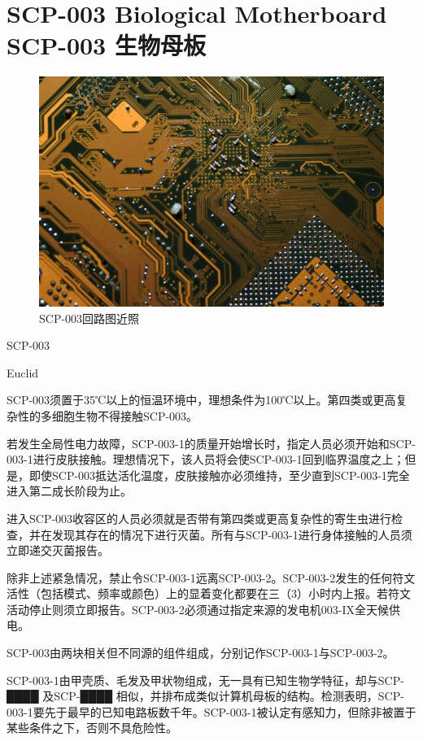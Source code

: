 \chapter[SCP-003 生物母板]{
	SCP-003 Biological Motherboard\\
	SCP-003 生物母板
}

\label{chap:SCP-003}

\begin{figure}[H]
	\centering
	\includegraphics[width=0.5\linewidth]{images/SCP.003.jpg}
	\caption*{SCP-003回路图近照}
\end{figure}

SCP-003

Euclid


SCP-003须置于35℃以上的恒温环境中，理想条件为100℃以上。第四类或更高复杂性的多细胞生物不得接触SCP-003。

若发生全局性电力故障，SCP-003-1的质量开始增长时，指定人员必须开始和SCP-003-1进行皮肤接触。理想情况下，该人员将会使SCP-003-1回到临界温度之上；但是，即使SCP-003抵达活化温度，皮肤接触亦必须维持，至少直到SCP-003-1完全进入第二成长阶段为止。

进入SCP-003收容区的人员必须就是否带有第四类或更高复杂性的寄生虫进行检查，并在发现其存在的情况下进行灭菌。所有与SCP-003-1进行身体接触的人员须立即递交灭菌报告。

除非上述紧急情况，禁止令SCP-003-1远离SCP-003-2。SCP-003-2发生的任何符文活性（包括模式、频率或颜色）上的显着变化都要在三（3）小时内上报。若符文活动停止则须立即报告。SCP-003-2必须通过指定来源的发电机003-IX全天候供电。

SCP-003由两块相关但不同源的组件组成，分别记作SCP-003-1与SCP-003-2。

SCP-003-1由甲壳质、毛发及甲状物组成，无一具有已知生物学特征，却与SCP-████ 及SCP-████ 相似，并排布成类似计算机母板的结构。检测表明，SCP-003-1要先于最早的已知电路板数千年。SCP-003-1被认定有感知力，但除非被置于某些条件之下，否则不具危险性。

